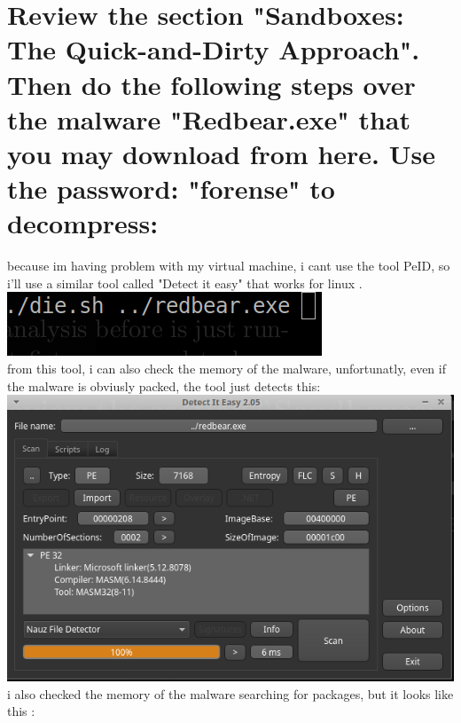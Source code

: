 \documentclass[10pt,a4paper]{article} %
\begin{document}
        \section{Review the section "Sandboxes: The Quick-and-Dirty Approach".
        Then do the following steps over the malware "Redbear.exe" that you may
        download from here. Use the password: "forense" to decompress:}
        \color{red} because im having problem with my virtual machine, i cant
        use the tool PeID, so i'll use a similar tool called "Detect it easy"
        that works for linux .
        \\
        \color{white}
        \includegraphics[width=0.4\linewidth]{diesh.png}
        \\
        from this tool, i can also check the memory of the malware, unfortunatly, even if the malware is obviusly packed, the tool just detects this:
        \\ \includegraphics[width=0.8\linewidth]{compiler.png}
        \\
        i also checked the memory of the malware searching for packages, but it looks like this :
\end{document}
